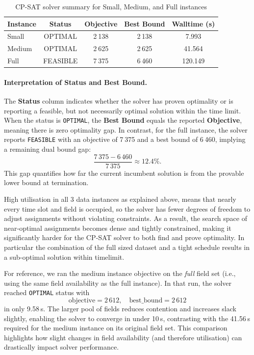 \documentclass[12pt]{article}
\begin{document}
\begin{table}[h]
  \centering
  \def\arraystretch{1.3}
  \begin{tabular}{l  c  c  c  c}
    \hline
    \textbf{Instance} 
      & \textbf{Status} 
      & \textbf{Objective} 
      & \textbf{Best Bound} 
      & \textbf{Walltime (s)} \\
    \hline
    Small  
      & OPTIMAL 
      & 2 138 
      & 2 138 
      & 7.993 \\
    Medium 
      & OPTIMAL 
      & 2 625 
      & 2 625 
      & 41.564 \\
    Full   
      & FEASIBLE 
      & 7 375 
      & 6 460 
      & 120.149 \\
    \hline
  \end{tabular}
  \caption{CP-SAT solver summary for Small, Medium, and Full instances}
  \label{tab:solver-summary}
\end{table}

\paragraph{Interpretation of Status and Best Bound.}
The \textbf{Status} column indicates whether the solver has proven optimality or is reporting a feasible, but not necessarily optimal solution within the time limit. When the status is \texttt{OPTIMAL}, the \textbf{Best Bound} equals the reported \textbf{Objective}, meaning there is zero optimality gap. In contrast, for the full instance, the solver reports \texttt{FEASIBLE} with an objective of 7 375 and a best bound of 6 460, implying a remaining dual bound gap:
\[
  \frac{7\,375 - 6\,460}{7\,375} \approx 12.4\%.
\]
This gap quantifies how far the current incumbent solution is from the provable lower bound at termination.

High utilisation in all 3 data instances as explained above, means that nearly every time slot and field is occupied, so the solver has fewer degrees of freedom to adjust assignments without violating constraints. As a result, the search space of near‐optimal assignments becomes dense and tightly constrained, making it significantly harder for the CP‐SAT solver to both find and prove optimality. In particular the combination of the full sized dataset and a tight schedule results in a sub-optimal solution within timelimit.

For reference, we ran the medium instance objective on the \emph{full} field set (i.e., using the same field availability as the full instance). In that run, the solver reached \texttt{OPTIMAL} status with
\[
  \text{objective} = 2\,612,\quad \text{best\_bound} = 2\,612
\]
in only 9.58 s. The larger pool of fields reduces contention and increases slack slightly, enabling the solver to converge in under 10 s, contrasting with the 41.56 s required for the medium instance on its original field set. This comparison highlights how slight changes in field availability (and therefore utilisation) can drastically impact solver performance.
\end{document}
